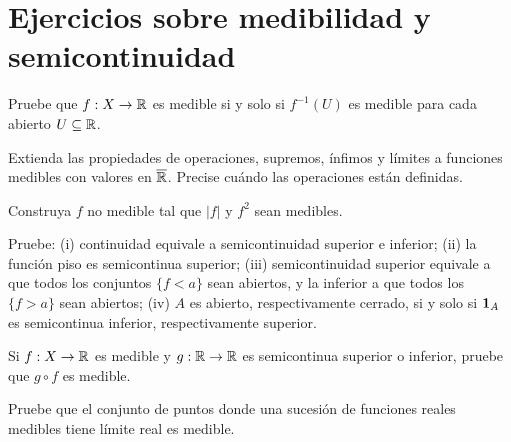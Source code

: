 \section{Ejercicios sobre medibilidad y semicontinuidad}
\begin{ejercicio}\label{ej:v2-l03-1}
Pruebe que $f:X\to\mathbb R$ es medible si y solo si $f^{-1}(U)$ es medible para cada abierto $U\subseteq\mathbb R$.
\end{ejercicio}

\begin{ejercicio}\label{ej:v2-l03-2}
Extienda las propiedades de operaciones, supremos, ínfimos y límites a funciones medibles con valores en $\overline{\mathbb R}$. Precise cuándo las operaciones están definidas.
\end{ejercicio}

\begin{ejercicio}\label{ej:v2-l03-3}
Construya $f$ no medible tal que $|f|$ y $f^2$ sean medibles.
\end{ejercicio}

\begin{ejercicio}\label{ej:v2-l03-4}
Pruebe: (i) continuidad equivale a semicontinuidad superior e inferior; (ii) la función piso es semicontinua superior; (iii) semicontinuidad superior equivale a que todos los conjuntos $\{f<a\}$ sean abiertos, y la inferior a que todos los $\{f>a\}$ sean abiertos; (iv) $A$ es abierto, respectivamente cerrado, si y solo si $\mathbf1_{A}$ es semicontinua inferior, respectivamente superior.
\end{ejercicio}

\begin{ejercicio}\label{ej:v2-l03-5}
Si $f:X\to\mathbb R$ es medible y $g:\mathbb R\to\mathbb R$ es semicontinua superior o inferior, pruebe que $g\circ f$ es medible.
\end{ejercicio}

\begin{ejercicio}\label{ej:v2-l03-6}
Pruebe que el conjunto de puntos donde una sucesión de funciones reales medibles tiene límite real es medible.
\end{ejercicio}
